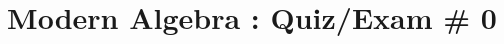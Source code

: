 \documentclass{article}
\begin{document}
\title{Modern Algebra : Quiz/Exam \# 0}
\author{}
\date{}
\maketitle


\begin{question} \kant[1]
\end{question} \vspace{18em}

\begin{question}\kant[2]
\end{question}
\end{document}
